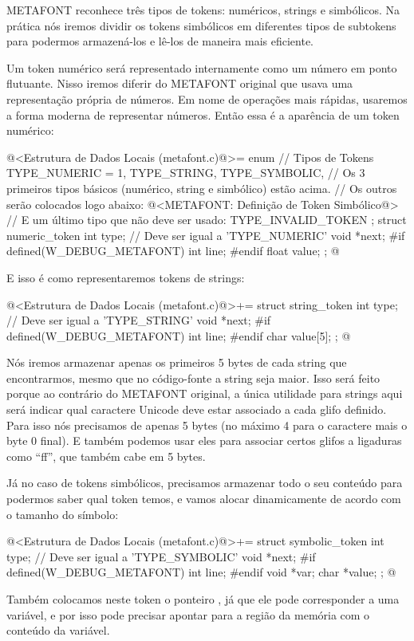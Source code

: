 METAFONT reconhece três tipos de tokens: numéricos, strings e
simbólicos. Na prática nós iremos dividir os tokens simbólicos em
diferentes tipos de subtokens para podermos armazená-los e lê-los de
maneira mais eficiente.

Um token numérico será representado internamente como um número em
ponto flutuante. Nisso iremos diferir do METAFONT original que usava
uma representação própria de números. Em nome de operações mais
rápidas, usaremos a forma moderna de representar números. Então essa é
a aparência de um token numérico:

\iniciocodigo
@<Estrutura de Dados Locais (metafont.c)@>=
enum { // Tipos de Tokens
  TYPE_NUMERIC = 1, TYPE_STRING, TYPE_SYMBOLIC,
  // Os 3 primeiros tipos básicos (numérico, string e simbólico) estão acima.
  // Os outros serão colocados logo abaixo:
  @<METAFONT: Definição de Token Simbólico@>
  // E um último tipo que não deve ser usado:
  TYPE_INVALID_TOKEN
};
struct numeric_token{
  int type;   // Deve ser igual a 'TYPE_NUMERIC'
  void *next;
#if defined(W_DEBUG_METAFONT)
  int line;
#endif
  float value;
};
@
\fimcodigo

E isso é como representaremos tokens de strings:

\iniciocodigo
@<Estrutura de Dados Locais (metafont.c)@>+=
struct string_token{
  int type;   // Deve ser igual a 'TYPE_STRING'
  void *next;
#if defined(W_DEBUG_METAFONT)
  int line;
#endif
  char value[5];
};
@
\fimcodigo

Nós iremos armazenar apenas os primeiros 5 bytes de cada string que
encontrarmos, mesmo que no código-fonte a string seja maior. Isso será
feito porque ao contrário do METAFONT original, a única utilidade para
strings aqui será indicar qual caractere Unicode deve estar associado
a cada glifo definido. Para isso nós precisamos de apenas 5 bytes (no
máximo 4 para o caractere mais o byte 0 final). E também podemos usar
eles para associar certos glifos a ligaduras como ``ff'', que também
cabe em 5 bytes.

Já no caso de tokens simbólicos, precisamos armazenar todo o seu
conteúdo para podermos saber qual token temos, e vamos alocar
dinamicamente de acordo com o tamanho do símbolo:

\iniciocodigo
@<Estrutura de Dados Locais (metafont.c)@>+=
struct symbolic_token{
  int type;   // Deve ser igual a 'TYPE_SYMBOLIC'
  void *next;
#if defined(W_DEBUG_METAFONT)
  int line;
#endif
  void *var;
  char *value;
};
@
\fimcodigo

Também colocamos neste token o ponteiro , já que ele
pode corresponder a uma variável, e por isso pode precisar apontar
para a região da memória com o conteúdo da variável.

